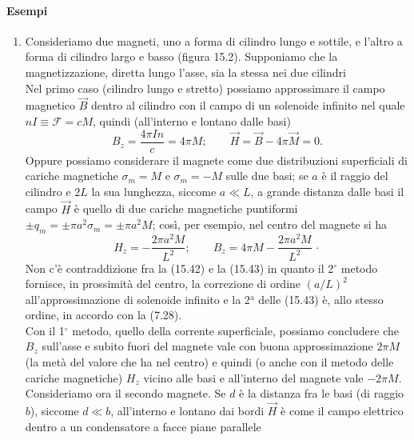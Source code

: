 \paragraph{Esempi}
\begin{enumerate}
  \item Consideriamo due magneti, uno a forma di cilindro lungo e sottile, e
    l'altro a forma di cilindro largo e basso (figura 15.2). Supponiamo che la
    magnetizzazione, diretta lungo l'asse, sia la stessa nei due cilindri\\
    Nel primo caso (cilindro lungo e stretto) possiamo approssimare il campo
    magnetico $\vec B$ dentro al cilindro con il campo di un solenoide infinito
    nel quale $nI\equiv\mathcal F=cM$, quindi (all'interno e lontano dalle basi)
    \begin{equation}
      B_z=\frac{4\pi In}{c}=4\pi M;\qquad\vec H=\vec B-4\pi\vec M=0.
      \tag{15.42}
    \end{equation}
    Oppure possiamo considerare il magnete come due distribuzioni superficiali
    di cariche magnetiche $\sigma_m=M$ e $\sigma_m=-M$ sulle due basi; se $a$
    \`e il raggio del cilindro e $2L$ la sua lunghezza, siccome $a\ll L$, a
    grande distanza dalle basi il campo $\vec H$ \`e quello di due cariche
    magnetiche puntiformi \ $\pm q_m=\pm\pi a^2\sigma_m=\pm\pi a^2M$; cos\`i,
    per esempio, nel centro del magnete si ha
    \begin{equation}
      H_z=-\frac{2\pi a^2M}{L^2};\qquad B_z=4\pi M-\frac{2\pi a^2M}{L^2}\,\cdot
      \tag{15.43}
    \end{equation}
    Non c'\`e contraddizione fra la (15.42) e la (15.43) in quanto il 2$^\circ$
    metodo fornisce, in prossimit\`a del centro, la correzione di ordine
    $(a/L)^2$ all'approssimazione di solenoide infinito e la 2$^\mathrm{a}$
    delle (15.43) \`e, allo stesso ordine, in accordo con la (7.28).\\
    Con il 1$^\circ$ metodo, quello della corrente superficiale, possiamo
    concludere che $B_z$ sull'asse e subito fuori del magnete vale con buona
    approssimazione $2\pi M$ (la met\`a del valore che ha nel centro) e quindi
    (o anche con il metodo delle cariche magnetiche) $H_z$ vicino alle basi e
    all'interno del magnete vale $-2\pi M$.\\
    Consideriamo ora il secondo magnete. Se $d$ \`e la distanza fra le basi (di
    raggio $b$), siccome $d\ll b$, all'interno e lontano dai bordi $\vec H$ \`e
    come il campo elettrico dentro a un condensatore a facce piane parallele

\end{enumerate}
